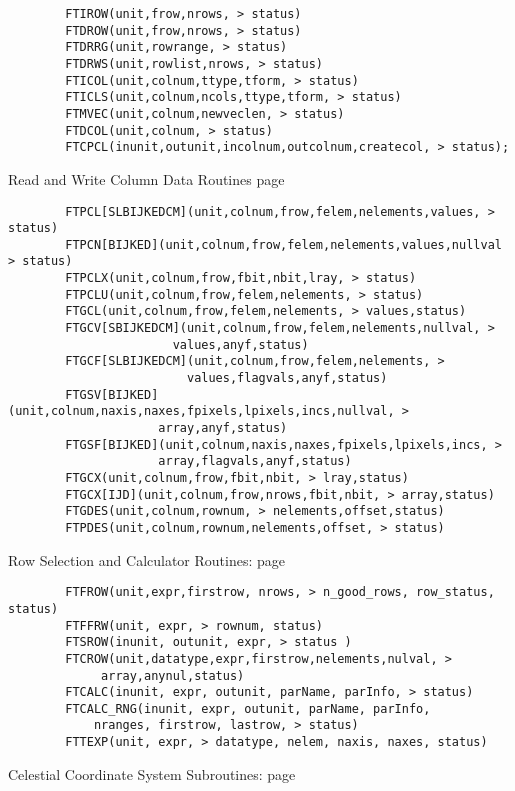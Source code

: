\documentclass[11pt]{book}
\begin{document}
\begin{verbatim}
        FTIROW(unit,frow,nrows, > status)
        FTDROW(unit,frow,nrows, > status)
        FTDRRG(unit,rowrange, > status)
        FTDRWS(unit,rowlist,nrows, > status)
        FTICOL(unit,colnum,ttype,tform, > status)
        FTICLS(unit,colnum,ncols,ttype,tform, > status)
        FTMVEC(unit,colnum,newveclen, > status)
        FTDCOL(unit,colnum, > status)
        FTCPCL(inunit,outunit,incolnum,outcolnum,createcol, > status);
\end{verbatim}
 Read and Write Column Data Routines page~\pageref{FTPCLS}

\begin{verbatim}
        FTPCL[SLBIJKEDCM](unit,colnum,frow,felem,nelements,values, > status)
        FTPCN[BIJKED](unit,colnum,frow,felem,nelements,values,nullval > status)
        FTPCLX(unit,colnum,frow,fbit,nbit,lray, > status)
        FTPCLU(unit,colnum,frow,felem,nelements, > status)
        FTGCL(unit,colnum,frow,felem,nelements, > values,status)
        FTGCV[SBIJKEDCM](unit,colnum,frow,felem,nelements,nullval, >
                       values,anyf,status)
        FTGCF[SLBIJKEDCM](unit,colnum,frow,felem,nelements, >
                         values,flagvals,anyf,status)
        FTGSV[BIJKED](unit,colnum,naxis,naxes,fpixels,lpixels,incs,nullval, >
                     array,anyf,status)
        FTGSF[BIJKED](unit,colnum,naxis,naxes,fpixels,lpixels,incs, >
                     array,flagvals,anyf,status)
        FTGCX(unit,colnum,frow,fbit,nbit, > lray,status)
        FTGCX[IJD](unit,colnum,frow,nrows,fbit,nbit, > array,status)
        FTGDES(unit,colnum,rownum, > nelements,offset,status)
        FTPDES(unit,colnum,rownum,nelements,offset, > status)
\end{verbatim}
 Row Selection and Calculator Routines: page~\pageref{FTFROW}

\begin{verbatim}
        FTFROW(unit,expr,firstrow, nrows, > n_good_rows, row_status, status)
        FTFFRW(unit, expr, > rownum, status)
        FTSROW(inunit, outunit, expr, > status )
        FTCROW(unit,datatype,expr,firstrow,nelements,nulval, >
             array,anynul,status)
        FTCALC(inunit, expr, outunit, parName, parInfo, > status)
        FTCALC_RNG(inunit, expr, outunit, parName, parInfo,
            nranges, firstrow, lastrow, > status)
        FTTEXP(unit, expr, > datatype, nelem, naxis, naxes, status)
\end{verbatim}
 Celestial Coordinate System Subroutines: page~\pageref{FTGICS}
\end{document}
